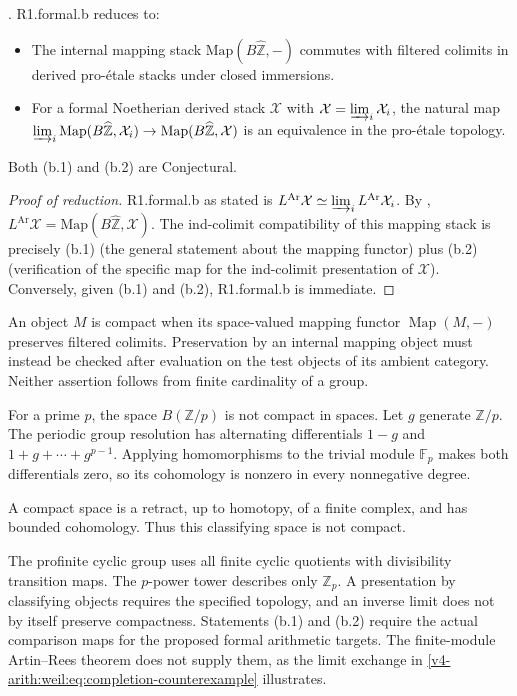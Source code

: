 \begin{proposition}
\label{v4-arith:bzn-sub:prop:R1-formal-b-domain}
\ClaimStatusProvedHere. R1.formal.b reduces to:
\begin{itemize}
\item[\textbf{(b.1)}] The internal mapping stack
\(\mathrm{Map}(B\widehat{\mathbb{Z}},-)\) commutes with filtered
colimits in derived pro-\'etale stacks under closed immersions.
\item[\textbf{(b.2)}] For a formal Noetherian derived stack
\(\mathcal{X}\) with \(\mathcal{X}=\varinjlim_{i}\mathcal{X}_{i}\),
the natural map
\(\varinjlim_{i}\mathrm{Map}(B\widehat{\mathbb{Z}},\mathcal{X}_{i})\to\mathrm{Map}(B\widehat{\mathbb{Z}},\mathcal{X})\)
is an equivalence in the pro-\'etale topology.
\end{itemize}
Both (b.1) and (b.2) are Conjectural.
\end{proposition}

\begin{proof}[Proof of reduction]
R1.formal.b as stated is
\(L^{\mathrm{Ar}}\mathcal{X}\simeq\varinjlim_{i}L^{\mathrm{Ar}}\mathcal{X}_{i}\).
By ,
\(L^{\mathrm{Ar}}\mathcal{X}=\mathrm{Map}(B\widehat{\mathbb{Z}},\mathcal{X})\).
The ind-colimit compatibility of this mapping stack is precisely
(b.1) (the general statement about the mapping functor) plus
(b.2) (verification of the specific map for the ind-colimit
presentation of \(\mathcal{X}\)). Conversely, given (b.1) and (b.2), R1.formal.b is
immediate.
\end{proof}

\begin{remark}
\label{v4-arith:bzn-sub:rem:R1-formal-b-not-automatic}
An object \(M\) is compact when its space-valued mapping functor
\(\operatorname{Map}(M,-)\) preserves filtered colimits.
Preservation by an internal mapping object must instead be checked
after evaluation on the test objects of its ambient category.
Neither assertion follows from finite cardinality of a group.

For a prime \(p\), the space \(B(\mathbb Z/p)\) is not compact in spaces.
Let \(g\) generate \(\mathbb Z/p\).
The periodic group resolution has alternating differentials
\(1-g\) and \(1+g+\cdots+g^{p-1}\). Applying homomorphisms to the
trivial module \(\mathbb F_p\) makes both differentials zero, so its
cohomology is nonzero in every nonnegative degree.

A compact space is a retract, up to homotopy, of a finite complex,
and has bounded cohomology. Thus this classifying space is not compact.

The profinite cyclic group uses all finite cyclic quotients with
divisibility transition maps. The \(p\)-power tower describes only
\(\mathbb Z_p\). A presentation by classifying objects requires
the specified topology, and an inverse limit does not by itself
preserve compactness. Statements (b.1) and (b.2) require the actual
comparison maps for the proposed formal arithmetic targets.
The finite-module Artin--Rees theorem does not supply them, as the
limit exchange in \eqref{v4-arith:weil:eq:completion-counterexample}
illustrates.
\end{remark}

